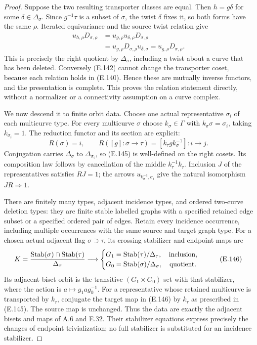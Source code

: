 \begin{proof}
Suppose the two resulting transporter classes are equal.
Then $h=g\delta$ for some $\delta\in\Delta_\sigma$.
Since $g^{-1}\tau$ is a subset of $\sigma$, the twist $\delta$
fixes it, so both forms have the same $\rho$.  Iterated
equivariance and the source twist relation give
\[
 \begin{aligned}
 u_{h,\rho}D_{\sigma,\rho}
 &=u_{g,\rho}u_{\delta,\rho}D_{\sigma,\rho}\\
 &=u_{g,\rho}D_{\sigma,\rho}u_{\delta,\sigma}
  =u_{g,\rho}D_{\sigma,\rho}.
 \end{aligned}                                                 \tag{E.144}
\]
This is precisely the right quotient by $\Delta_\sigma$,
including a twist about a curve that has been deleted.
Conversely (E.142) cannot change the transporter coset,
because each relation holds in (E.140).  Hence these are
mutually inverse functors, and the presentation is complete.
This proves the relation statement directly, without a
normalizer or a connectivity assumption on a curve complex.

We now descend it to finite orbit data.  Choose one actual
representative $\sigma_i$ of each multicurve type.  For every
multicurve $\sigma$ choose $k_\sigma\in\Gamma$ with
$k_\sigma\sigma=\sigma_i$, taking $k_{\sigma_i}=1$.
The reduction functor and its section are explicit:
\[
 R(\sigma)=i,\qquad
 R([g]:\sigma\to\tau)
       =[k_\tau g k_\sigma^{-1}]:i\to j.                     \tag{E.145}
\]
Conjugation carries $\Delta_\sigma$ to $\Delta_{\sigma_i}$,
so (E.145) is well-defined on the right cosets.  Its
composition law follows by cancellation of the middle
$k_\tau^{-1}k_\tau$.  Inclusion $J$ of the representatives
satisfies $RJ=1$; the arrows $u_{k_\sigma^{-1},\sigma_i}$
give the natural isomorphism $JR\Rightarrow1$.

There are finitely many types, adjacent incidence types,
and ordered two-curve deletion types: they are finite stable
labelled graphs with a specified retained edge subset or a
specified ordered pair of edges.  Retain every incidence
occurrence, including multiple occurrences with the same
source and target graph type.  For a chosen actual adjacent
flag $\sigma\supset\tau$, its crossing stabilizer and endpoint
maps are
\[
 K=\frac{\operatorname{Stab}(\sigma)\cap\operatorname{Stab}(\tau)}{\Delta_\tau}
 \longrightarrow
 \begin{cases}
 G_1=\operatorname{Stab}(\tau)/\Delta_\tau,\quad\text{inclusion},\\
 G_0=\operatorname{Stab}(\sigma)/\Delta_\sigma,\quad\text{quotient}.
 \end{cases}                                                   \tag{E.146}
\]
Its adjacent biset orbit is the transitive
$(G_1\times G_0)$-set with that stabilizer, where the action
is $a\mapsto g_1ag_0^{-1}$.  For a representative whose
retained multicurve is transported by $k_\tau$, conjugate
the target map in (E.146) by $k_\tau$ as prescribed in
(E.145).  The source map is unchanged.  Thus the data are
exactly the adjacent bisets and maps of A.6 and E.32.
Their stabilizer equations express precisely the changes
of endpoint trivialization; no full stabilizer is substituted
for an incidence stabilizer.


\end{proof}
